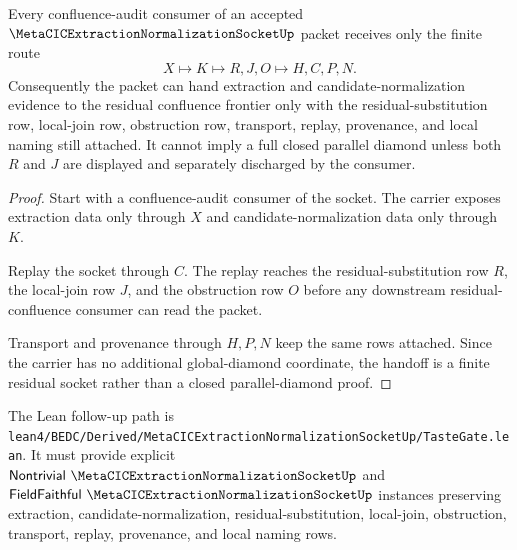 \begin{theorem}
\label{thm:metacic-extraction-normalization-socket-residual-handoff}
Every confluence-audit consumer of an accepted $\MetaCICExtractionNormalizationSocketUp$ packet receives only the finite route
$$
X \longmapsto K \longmapsto R,J,O \longmapsto H,C,P,N .
$$
Consequently the packet can hand extraction and candidate-normalization evidence to the residual confluence frontier only with the residual-substitution row, local-join row, obstruction row, transport, replay, provenance, and local naming still attached. It cannot imply a full closed parallel diamond unless both $R$ and $J$ are displayed and separately discharged by the consumer.
\end{theorem}
\begin{proof}
Start with a confluence-audit consumer of the socket. The carrier exposes extraction data only through $X$ and candidate-normalization data only through $K$.

Replay the socket through $C$. The replay reaches the residual-substitution row $R$, the local-join row $J$, and the obstruction row $O$ before any downstream residual-confluence consumer can read the packet.

Transport and provenance through $H,P,N$ keep the same rows attached. Since the carrier has no additional global-diamond coordinate, the handoff is a finite residual socket rather than a closed parallel-diamond proof.
\end{proof}



The Lean follow-up path is \texttt{lean4/BEDC/Derived/MetaCICExtractionNormalizationSocketUp/TasteGate.lean}. It must provide explicit $\mathsf{Nontrivial}\ \MetaCICExtractionNormalizationSocketUp$ and $\mathsf{FieldFaithful}\ \MetaCICExtractionNormalizationSocketUp$ instances preserving extraction, candidate-normalization, residual-substitution, local-join, obstruction, transport, replay, provenance, and local naming rows.

